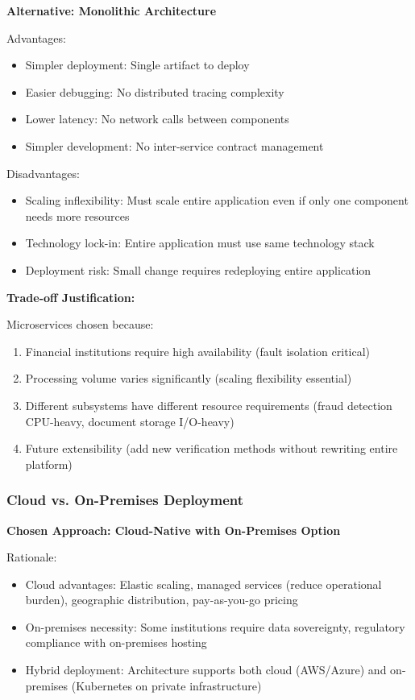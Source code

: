 \textbf{Alternative: Monolithic Architecture}

Advantages:
\begin{itemize}
\item Simpler deployment: Single artifact to deploy
\item Easier debugging: No distributed tracing complexity
\item Lower latency: No network calls between components
\item Simpler development: No inter-service contract management
\end{itemize}

Disadvantages:
\begin{itemize}
\item Scaling inflexibility: Must scale entire application even if only one component needs more resources
\item Technology lock-in: Entire application must use same technology stack
\item Deployment risk: Small change requires redeploying entire application
\end{itemize}

\textbf{Trade-off Justification:}

Microservices chosen because:
\begin{enumerate}
\item Financial institutions require high availability (fault isolation critical)
\item Processing volume varies significantly (scaling flexibility essential)
\item Different subsystems have different resource requirements (fraud detection CPU-heavy, document storage I/O-heavy)
\item Future extensibility (add new verification methods without rewriting entire platform)
\end{enumerate}

\subsubsection{Cloud vs. On-Premises Deployment}

\textbf{Chosen Approach: Cloud-Native with On-Premises Option}

Rationale:
\begin{itemize}
\item Cloud advantages: Elastic scaling, managed services (reduce operational burden), geographic distribution, pay-as-you-go pricing
\item On-premises necessity: Some institutions require data sovereignty, regulatory compliance with on-premises hosting
\item Hybrid deployment: Architecture supports both cloud (AWS/Azure) and on-premises (Kubernetes on private infrastructure)
\end{itemize}

